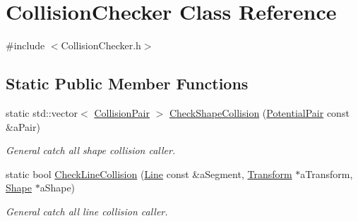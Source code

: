 \hypertarget{classCollisionChecker}{}\section{Collision\+Checker Class Reference}
\label{classCollisionChecker}


{\ttfamily \#include $<$Collision\+Checker.\+h$>$}

\subsection*{Static Public Member Functions}
\begin{DoxyCompactItemize}
\item 
static std\+::vector$<$ \hyperlink{structCollisionPair}{Collision\+Pair} $>$ \hyperlink{classCollisionChecker_a75a7fc27a2c34c60debd7f29bf55cd8e}{Check\+Shape\+Collision} (\hyperlink{structPotentialPair}{Potential\+Pair} const \&a\+Pair)
\begin{DoxyCompactList}\small\item\em General catch all shape collision caller. \end{DoxyCompactList}\item 
static bool \hyperlink{classCollisionChecker_ac89a35e9658cb6b5aca5a1a7ef33b64a}{Check\+Line\+Collision} (\hyperlink{structLine}{Line} const \&a\+Segment, \hyperlink{classTransform}{Transform} $\ast$a\+Transform, \hyperlink{structShape}{Shape} $\ast$a\+Shape)
\begin{DoxyCompactList}\small\item\em General catch all line collision caller. \end{DoxyCompactList}\end{DoxyCompactItemize}
